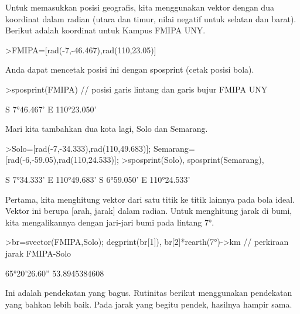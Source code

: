 \documentclass{article}
\newenvironment{eulernotebook}{\par}{\par}
\newenvironment{eulercomment}{\par\medskip}{\par\medskip}
\begin{document}
\begin{eulernotebook}
\begin{eulercomment}
\begin{eulercomment}
\begin{eulercomment}
\begin{eulercomment}
\begin{eulercomment}
Untuk memasukkan posisi geografis, kita menggunakan vektor dengan dua
koordinat dalam radian (utara dan timur, nilai negatif untuk selatan
dan barat). Berikut adalah koordinat untuk Kampus FMIPA UNY.
\end{eulercomment}
\begin{eulerprompt}
>FMIPA=[rad(-7,-46.467),rad(110,23.05)]
\end{eulerprompt}
\begin{euleroutput}
  [-0.13569,  1.92657]
\end{euleroutput}
\begin{eulercomment}
Anda dapat mencetak posisi ini dengan sposprint (cetak posisi bola).
\end{eulercomment}
\begin{eulerprompt}
>sposprint(FMIPA) // posisi garis lintang dan garis bujur FMIPA UNY
\end{eulerprompt}
\begin{euleroutput}
  S 7°46.467' E 110°23.050'
\end{euleroutput}
\begin{eulercomment}
Mari kita tambahkan dua kota lagi, Solo dan Semarang.
\end{eulercomment}
\begin{eulerprompt}
>Solo=[rad(-7,-34.333),rad(110,49.683)]; Semarang=[rad(-6,-59.05),rad(110,24.533)];
>sposprint(Solo), sposprint(Semarang),
\end{eulerprompt}
\begin{euleroutput}
  S 7°34.333' E 110°49.683'
  S 6°59.050' E 110°24.533'
\end{euleroutput}
\begin{eulercomment}
Pertama, kita menghitung vektor dari satu titik ke titik lainnya pada
bola ideal. Vektor ini berupa [arah, jarak] dalam radian. Untuk
menghitung jarak di bumi, kita mengalikannya dengan jari-jari bumi
pada lintang 7°.
\end{eulercomment}
\begin{eulerprompt}
>br=svector(FMIPA,Solo); degprint(br[1]), br[2]*rearth(7°)->km // perkiraan jarak FMIPA-Solo
\end{eulerprompt}
\begin{euleroutput}
  65°20'26.60''
  53.8945384608
\end{euleroutput}
\begin{eulercomment}
Ini adalah pendekatan yang bagus. Rutinitas berikut menggunakan
pendekatan yang bahkan lebih baik. Pada jarak yang begitu pendek,
hasilnya hampir sama.
\end{eulercomment}

\end{eulercomment}
\end{eulercomment}
\end{eulercomment}
\end{eulercomment}
\end{eulernotebook}
\end{document}
